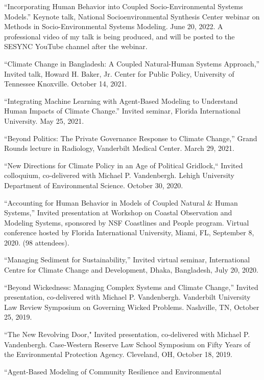 %
%
\item ``Incorporating Human Behavior into Coupled Socio-Environmental Systems
   Models.'' Keynote talk, National Socioenvironmental Synthesis Center
   webinar on Methods in Socio-Environmental Systems Modeling.
   June 20, 2022. A professional video of my talk is being produced, and will
   be posted to the SESYNC YouTube channel after the webinar.
\item ``Climate Change in Bangladesh: A Coupled Natural-Human Systems
   Approach,'' Invited talk, Howard H. Baker, Jr. Center for Public Policy,
   University of Tennessee Knoxville. October 14, 2021.
\item ``Integrating Machine Learning with Agent-Based Modeling to Understand
  Human Impacts of Climate Change.'' Invited seminar, Florida International
  University. May 25, 2021.
\item ``Beyond Politics: The Private Governance Response to Climate
  Change,'' Grand Rounds lecture in Radiology, Vanderbilt Medical Center.
  March 29, 2021.
\item ``New Directions for Climate Policy in an Age of Political Gridlock,``
  Invited colloquium, co-delivered with Michael P. Vandenbergh. Lehigh
  University Department of Environmental Science. October 30, 2020.
\item ``Accounting for Human Behavior in Models of Coupled Natural \& Human
  Systems,'' Invited presentation at Workshop on Coastal Observation and
  Modeling Systems, sponsored by NSF Coastlines and People program. Virtual
  conference hosted by Florida International University, Miami, FL,
  September 8, 2020. (98 attendees).
\item ``Managing Sediment for Sustainability,'' Invited virtual seminar,
  International Centre for Climate Change and Development, Dhaka, Bangladesh,
  July 20, 2020.
\item ``Beyond Wickedness: Managing Complex Systems and Climate Change,''
  Invited presentation, co-delivered with Michael P. Vandenbergh. Vanderbilt
  University Law Review Symposium on Governing Wicked Problems. Nashville, TN,
  October 25, 2019.
\item ``The New Revolving Door," Invited presentation, co-delivered with
  Michael P. Vandenbergh. Case-Western Reserve Law School Symposium on Fifty
  Years of the Environmental Protection Agency. Cleveland, OH, October 18, 2019.
\item ``Agent-Based Modeling of Community Resilience and Environmental
